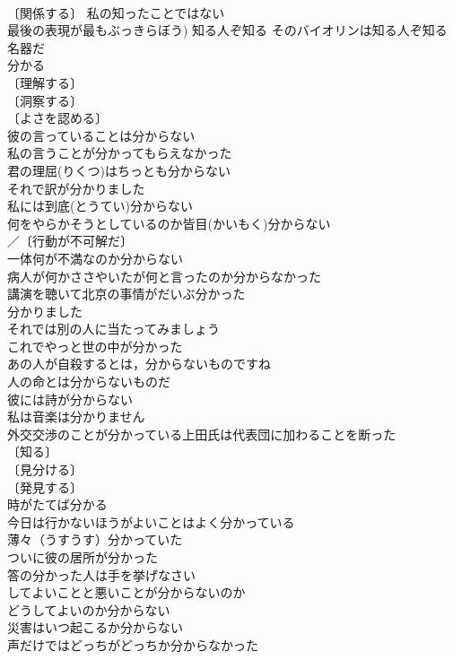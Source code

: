 \documentclass[8pt]{extreport}
\begin{document}
\begin{CJK}{UTF8}{min}
\\	〔関係する〕 私の知ったことではない 
\\	最後の表現が最もぶっきらぼう) 知る人ぞ知る そのバイオリンは知る人ぞ知る名器だ 
\\	分かる	
\\	〔理解する〕
\\	〔洞察する〕
\\	〔よさを認める〕
\\	彼の言っていることは分からない 
\\	私の言うことが分かってもらえなかった 
\\	君の理屈(りくつ)はちっとも分からない 
\\	それで訳が分かりました 
\\	私には到底(とうてい)分からない 
\\	何をやらかそうとしているのか皆目(かいもく)分からない 
\\	／〔行動が不可解だ〕
\\	一体何が不満なのか分からない 
\\	病人が何かささやいたが何と言ったのか分からなかった 
\\	講演を聴いて北京の事情がだいぶ分かった 
\\	分かりました
\\	それでは別の人に当たってみましょう 
\\	これでやっと世の中が分かった 
\\	あの人が自殺するとは，分からないものですね 
\\	人の命とは分からないものだ 
\\	彼には詩が分からない 
\\	私は音楽は分かりません 
\\	外交交渉のことが分かっている上田氏は代表団に加わることを断った 
\\	〔知る〕
\\	〔見分ける〕
\\	〔発見する〕
\\	時がたてば分かる 
\\	今日は行かないほうがよいことはよく分かっている 
\\	薄々（うすうす）分かっていた 
\\	ついに彼の居所が分かった 
\\	答の分かった人は手を挙げなさい 
\\	してよいことと悪いことが分からないのか 
\\	どうしてよいのか分からない 
\\	災害はいつ起こるか分からない 
\\	声だけではどっちがどっちか分からなかった 

\end{CJK}
\end{document}
